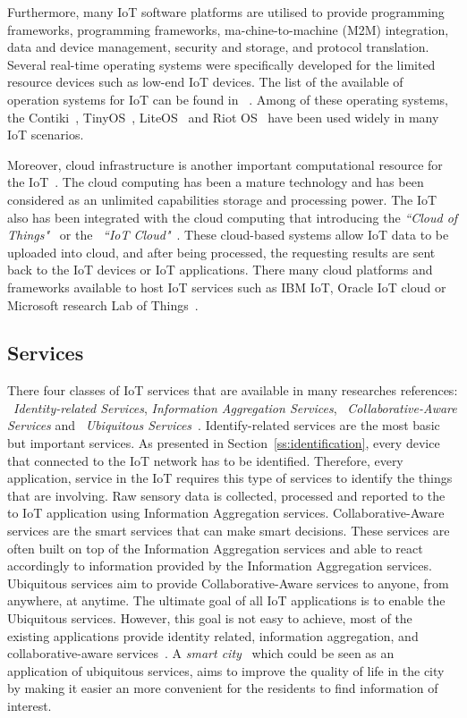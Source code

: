 Furthermore, many IoT software platforms are utilised to provide programming frameworks, programming frameworks, ma-chine-to-machine (M2M) integration, data and device management, security and storage, and protocol translation. 
Several real-time operating systems were specifically developed for the limited resource devices such as low-end IoT devices.
The list of the available of operation systems for IoT can be found in ~\citep{}.
Among of these operating systems, the Contiki~\citep{}, TinyOS~\citep{}, LiteOS~\citep{} and Riot OS~\citep{} have been used widely in many IoT scenarios. 


Moreover, cloud infrastructure is another important computational resource for the IoT~\citep{Botta:2016}.
The cloud computing has been a mature technology and has been considered as an unlimited capabilities storage and processing power.
The IoT also has been integrated with the cloud computing that introducing the \textit{``Cloud of Things"}~\citep{Jiehan:2013} or the ~\textit{``IoT Cloud"}~\citep{Truong:2015}.
These cloud-based systems allow IoT data to be uploaded into cloud, and after being processed, the requesting results are sent back to the IoT devices or IoT applications.
There many cloud platforms and frameworks available to host IoT services such as IBM IoT, Oracle IoT cloud or Microsoft research Lab of Things~\citep{}.

\subsection{Services}

There four classes of IoT services that are available in many researches references: ~\textit{Identity-related Services}, \textit{Information Aggregation Services}, ~\textit{Collaborative-Aware Services} and ~\textit{Ubiquitous Services}~\citep{Mohammed:2015}.
Identify-related services are the most basic but important services. 
As presented in Section~\ref{ss:identification}, every device that connected to the IoT network has to be identified.
Therefore, every application, service in the IoT requires this type of services to identify the things that are involving. 
Raw sensory data is collected, processed and reported to the to IoT application using Information Aggregation services. 
Collaborative-Aware services are the smart services that can make smart decisions.
These services are often built on top of the Information Aggregation services and able to react accordingly to information provided by the Information Aggregation services.
Ubiquitous services aim to provide Collaborative-Aware services to anyone, from anywhere, at anytime.
The ultimate goal of all IoT applications is to enable the Ubiquitous services.
However, this goal is not easy to achieve, most of the existing applications provide identity related, information aggregation, and collaborative-aware services~\citep{Al-Fuqaha:2015}.
A \textit{smart city}~\citep{Jin:2014, Zanella:2014} which could be seen as an application of ubiquitous services, aims to improve the quality of life in the city by making it easier an more convenient for the residents to find information of interest.

